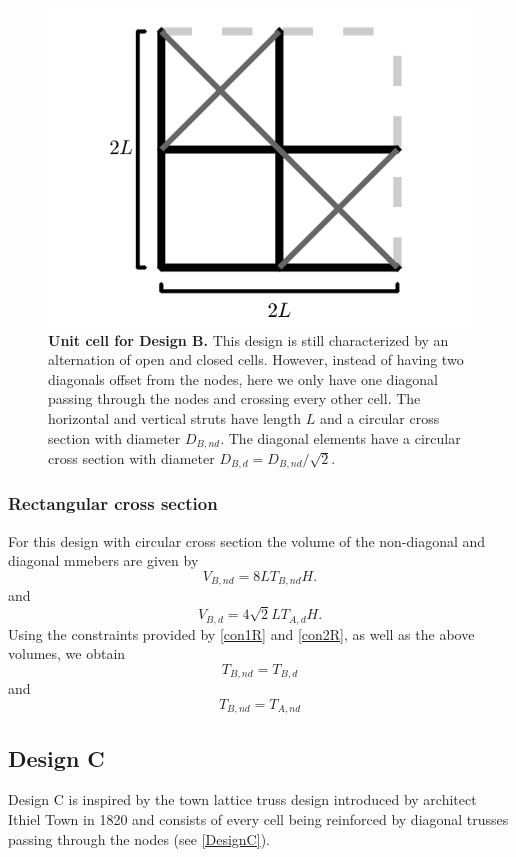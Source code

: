 \documentclass[10pt,twoside]{fernandes_supp}
\begin{document}
\begin{figure}[H]
    \centering
    \includegraphics[width=0.4\linewidth]{SFig3.png}
    \caption{{\bf Unit cell for Design B.} This design is still characterized by an alternation of open and closed cells. However, instead of having two  diagonals offset from the nodes, here we only have one diagonal passing through the nodes and crossing every other cell. The horizontal and vertical struts have length $L$ and a circular cross section with diameter $D_{B,nd}$. The diagonal elements have a circular cross section  with diameter $D_{B,d}={D_{B,nd}}/{\sqrt{2}}$.}
    \label{DesignB}
\end{figure}

\subsubsection{Rectangular cross section}
For this design with circular cross section the volume of the non-diagonal and diagonal mmebers  are given by
\begin{equation}
		V_{B,nd}=8LT_{B,nd}H.
\end{equation}
and
\begin{equation}
		V_{B,d}=4\sqrt{2}LT_{A,d}H.
\end{equation}
Using the constraints provided by \cref{con1R} and \cref{con2R}, as well as the above volumes, we  obtain
\begin{equation}
	T_{B,nd}=T_{B,d}
\end{equation}
and
\begin{equation}
	T_{B,nd}=T_{A,nd}
\end{equation}

\subsection{Design C}
Design C is inspired by the town lattice truss design introduced by architect Ithiel Town in 1820 \citep{waddell1916} and consists of every cell being reinforced by diagonal trusses passing through the nodes (see \cref{DesignC}).
\end{document}

